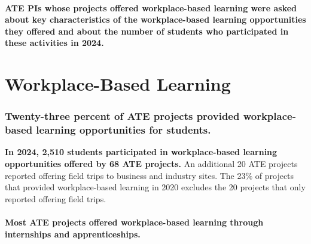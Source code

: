 \documentclass[
]{report}
\begin{document}
\hypertarget{ate-pis-whose-projects-offered-workplace-based-learning-were-asked-about-key-characteristics-of-the-workplace-based-learning-opportunities-they-offered-and-about-the-number-of-students-who-participated-in-these-activities-in-2024.}{%
\paragraph{ATE PIs whose projects offered workplace-based learning were asked about key characteristics of the workplace-based learning opportunities they offered and about the number of students who participated in these activities in 2024.}\label{ate-pis-whose-projects-offered-workplace-based-learning-were-asked-about-key-characteristics-of-the-workplace-based-learning-opportunities-they-offered-and-about-the-number-of-students-who-participated-in-these-activities-in-2024.}}

\hypertarget{workplace-based-learning-1}{%
\section{Workplace-Based Learning}\label{workplace-based-learning-1}}

\hypertarget{twenty-three-percent-of-ate-projects-provided-workplace-based-learning-opportunities-for-students.}{%
\subsubsection{Twenty-three percent of ATE projects provided workplace-based learning opportunities for students.}\label{twenty-three-percent-of-ate-projects-provided-workplace-based-learning-opportunities-for-students.}}

\textbf{In 2024, 2,510 students participated in workplace-based learning opportunities offered by 68 ATE projects.} An additional 20 ATE projects reported offering field trips to business and industry sites. The 23\% of projects that provided workplace-based learning in 2020 excludes the 20 projects that only reported offering field trips.

\hypertarget{most-ate-projects-offered-workplace-based-learning-through-and-.}{%
\paragraph{\texorpdfstring{Most ATE projects offered workplace-based learning through \textcolor{245075}{\textbf{internships}} and \textcolor{B03E61}{\textbf{apprenticeships}}.}{Most ATE projects offered workplace-based learning through  and .}}\label{most-ate-projects-offered-workplace-based-learning-through-and-.}}
\end{document}
